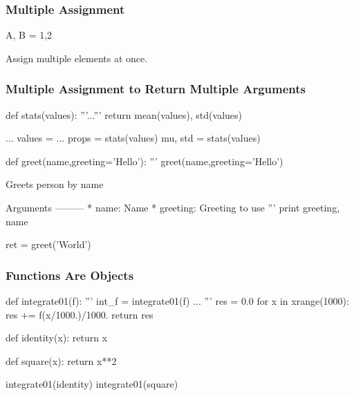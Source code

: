\begin{frame}[fragile]
\frametitle{Multiple Assignment}

\begin{python}
A, B = 1,2
\end{python}

Assign multiple elements at once.
\end{frame}

\begin{frame}[fragile]
\frametitle{Multiple Assignment to Return Multiple Arguments}

\begin{python}
def stats(values):
    '''...'''
    return mean(values), std(values)

...
values = ...
props = stats(values)
mu, std = stats(values)
\end{python}

\end{frame}

\begin{frame}[fragile]

\begin{python}
def greet(name,greeting='Hello'):
    '''
    greet(name,greeting='Hello')

    Greets person by name

    Arguments
    ---------
        * name: Name
        * greeting: Greeting to use
    '''
    print greeting, name

ret = greet('World')

\end{python}

\end{frame}

\begin{frame}[fragile]
\frametitle{Functions Are Objects}

\begin{python}

def integrate01(f):
    '''
    int_f = integrate01(f)
    ...
    '''
    res = 0.0
    for x in xrange(1000):
        res += f(x/1000.)/1000.
    return res

def identity(x):
    return x

def square(x):
    return x**2

integrate01(identity)
integrate01(square)
\end{python}

\end{frame}

